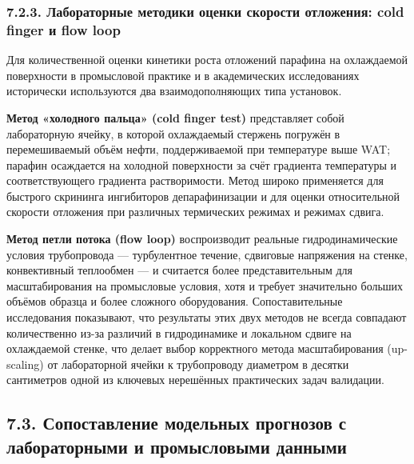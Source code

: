 \documentclass[11pt]{extarticle}
\begin{document}
\subsubsection{7.2.3. Лабораторные методики оценки скорости отложения: cold finger и flow loop}\label{ux43bux430ux431ux43eux440ux430ux442ux43eux440ux43dux44bux435-ux43cux435ux442ux43eux434ux438ux43aux438-ux43eux446ux435ux43dux43aux438-ux441ux43aux43eux440ux43eux441ux442ux438-ux43eux442ux43bux43eux436ux435ux43dux438ux44f-cold-finger-ux438-flow-loop}

Для количественной оценки кинетики роста отложений парафина на охлаждаемой поверхности в промысловой практике и в академических исследованиях исторически используются два взаимодополняющих типа установок.

\textbf{Метод «холодного пальца» (cold finger test)} представляет собой лабораторную ячейку, в которой охлаждаемый стержень погружён в перемешиваемый объём нефти, поддерживаемой при температуре выше WAT; парафин осаждается на холодной поверхности за счёт градиента температуры и соответствующего градиента растворимости. Метод широко применяется для быстрого скрининга ингибиторов депарафинизации и для оценки относительной скорости отложения при различных термических режимах и режимах сдвига.

\textbf{Метод петли потока (flow loop)} воспроизводит реальные гидродинамические условия трубопровода --- турбулентное течение, сдвиговые напряжения на стенке, конвективный теплообмен --- и считается более представительным для масштабирования на промысловые условия, хотя и требует значительно больших объёмов образца и более сложного оборудования. Сопоставительные исследования показывают, что результаты этих двух методов не всегда совпадают количественно из-за различий в гидродинамике и локальном сдвиге на охлаждаемой стенке, что делает выбор корректного метода масштабирования (up-scaling) от лабораторной ячейки к трубопроводу диаметром в десятки сантиметров одной из ключевых нерешённых практических задач валидации.

\subsection{7.3. Сопоставление модельных прогнозов с лабораторными и промысловыми данными}\label{ux441ux43eux43fux43eux441ux442ux430ux432ux43bux435ux43dux438ux435-ux43cux43eux434ux435ux43bux44cux43dux44bux445-ux43fux440ux43eux433ux43dux43eux437ux43eux432-ux441-ux43bux430ux431ux43eux440ux430ux442ux43eux440ux43dux44bux43cux438-ux438-ux43fux440ux43eux43cux44bux441ux43bux43eux432ux44bux43cux438-ux434ux430ux43dux43dux44bux43cux438}
\end{document}
